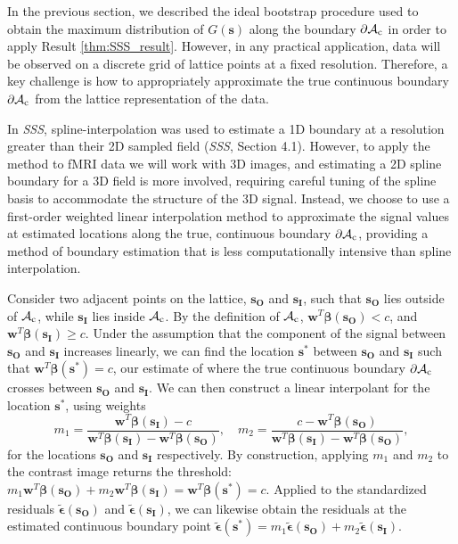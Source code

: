 In the previous section, we described the ideal bootstrap procedure used to obtain the maximum distribution of $G(\bm{s})$ along the boundary $\operatorname{\partial\mathcal{A}_{c}}$ in order to apply Result \ref{thm:SSS_result}. However, in any practical application, data will be observed on a discrete grid of lattice points at a fixed resolution. Therefore, a key challenge is how to appropriately approximate the true continuous boundary $\operatorname{\partial\mathcal{A}_{c}}$ from the lattice representation of the data. 

In \textit{SSS}, spline-interpolation was used to estimate a 1D boundary at a resolution greater than their 2D sampled field (\textit{SSS}, Section 4.1). However, to apply the method to fMRI data we will work with 3D images, and estimating a 2D spline boundary for a 3D field is more involved, requiring careful tuning of the spline basis to accommodate the structure of the 3D signal. Instead, we choose to use a first-order weighted linear interpolation method to approximate the signal values at estimated locations along the true, continuous boundary $\operatorname{\partial\mathcal{A}_{c}}$, providing a method of boundary estimation that is less computationally intensive than spline interpolation.

Consider two adjacent points on the lattice, $\bm{s_O}$ and $\bm{s_I}$, such that $\bm{s_O}$ lies outside of $\operatorname{\mathcal{A}_{c}}$, while $\bm{s_I}$ lies inside $\operatorname{\mathcal{A}_{c}}$. By the definition of $\operatorname{\mathcal{A}_{c}}$, $\bm{w}^{T}\bm{\beta}(\bm{s_O}) < c$, and $\bm{w}^{T}\bm{\beta}(\bm{s_I}) \geq c$. Under the assumption that the component of the signal between $\bm{s_O}$ and $\bm{s_I}$ increases linearly, we can find the location $\bm{s}^{*}$ between $\bm{s_O}$ and $\bm{s_I}$ such that $\bm{w}^{T}\bm{\beta}(\bm{s}^{*}) = c$, our estimate of where the true continuous boundary $\operatorname{\partial\mathcal{A}_{c}}$ crosses between $\bm{s_O}$ and $\bm{s_I}$. We can then construct a linear interpolant for the location $\bm{s}^{*}$, using weights
\begin{equation}
\label{eq:interpolation_weights}
m_{1} = \frac{\bm{w}^{T}\bm{\beta}(\bm{s_I}) - c}{\bm{w}^{T}\bm{\beta}(\bm{s_I}) - \bm{w}^{T}\bm{\beta}(\bm{s_O})}, \quad m_{2} = \frac{c - \bm{w}^{T}\bm{\beta}(\bm{s_O})}{\bm{w}^{T}\bm{\beta}(\bm{s_I}) - \bm{w}^{T}\bm{\beta}(\bm{s_O})},
\end{equation}
for the locations $\bm{s_O}$ and $\bm{s_I}$ respectively. By construction, applying $m_1$ and $m_2$ to the contrast image returns the threshold: $m_1 \bm{w}^{T}\bm{\beta}(\bm{s_O}) + m_2 \bm{w}^{T}\bm{\beta}(\bm{s_I}) = \bm{w}^{T}\bm{\beta}(\bm{s}^{*}) = c$. Applied to the standardized residuals %
$\tilde{\bm{\epsilon}}(\bm{s_O})$ and $\tilde{\bm{\epsilon}}(\bm{s_I})$, we can likewise obtain the residuals at the estimated continuous boundary point $\tilde{\bm{\epsilon}}(\bm{s}^{*}) = m_1 \tilde{\bm{\epsilon}}(\bm{s_O}) + m_2\tilde{\bm{\epsilon}}(\bm{s_I})$.

